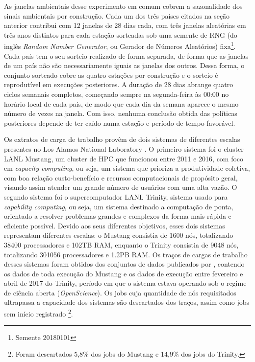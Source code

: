 As janelas ambientais desse experimento em comum cobrem a sazonalidade dos sinais ambientais por construção. Cada um
dos três países citados na seção anterior contribui com 12 janelas de 28 dias cada, com três janelas aleatórias em três anos distintos para cada
estação sorteadas sob uma semente de RNG (do inglês \textit{Random Number Generator}, ou Gerador de Números Aleatórios)
fixa\footnote{Semente 20180101}. Cada país tem o seu sorteio realizado de forma separada, de forma que as janelas de um país
não são necessariamente iguais as janelas dos outros. Dessa forma, o conjunto sorteado cobre as quatro estações por construção e o sorteio é reprodutível em execuções 
posteriores. A duração de 28 dias abrange quatro ciclos semanais completos, começando sempre na segunda-feira às 00:00 no horário local
de cada país, de modo que cada dia da semana aparece o mesmo número de vezes na janela. Com isso, nenhuma conclusão 
obtida das políticas posteriores depende de ter caído numa estação e período de tempo favorável.

Os extratos de carga de trabalho provêm de dois sistemas de diferentes escalas presentes no Los Alamos National Laboratory
\citep{lanl}. O primeiro sistema foi o cluster LANL Mustang, um cluster de HPC que funcionou entre 
2011 e 2016, com foco em \textit{capacity computing}, ou seja, um sistema que prioriza a produtividade coletiva, 
com boa relação custo-benefício e recursos computacionais de propósito geral, visando assim atender um grande número 
de usuários com uma alta vazão. O segundo sistema foi o supercomputador LANL Trinity, sistema usado para \textit{capability
computing}, ou seja, um sistema destinado a computação de ponta, orientado a resolver problemas grandes e complexos
da forma mais rápida e eficiente possível. Devido aos seus diferentes objetivos, esses dois sistemas representam diferentes escalas:
o Mustang consistia de 1600 nós, totalizando 38400 processadores e 102TB RAM, enquanto o Trinity consistia de 9048 nós, totalizando
301056 processadores e 1.2PB RAM. Os traços de cargas de trabalho desses sistemas foram obtidos dos conjuntos de dados
publicados por \textcite{atlas-lanl}, contendo os dados de toda execução do Mustang e os dados de execução entre fevereiro
e abril de 2017 do Trinity, período em que o sistema estava operando sob o regime de ciência aberta 
(\textit{OpenScience}). Os jobs cuja quantidade
de nós requisitados ultrapassa a capacidade dos sistemas são descartados dos traços, assim como jobs sem início registrado
\footnote{Foram descartados 5,8\% dos jobs do Mustang e 14,9\% dos jobs do Trinity.}.

